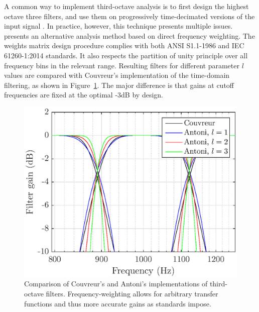 \documentclass[final,3p,times,twocolumn]{elsarticle}
\begin{document}
A common way to implement third-octave analysis is to first design the highest octave three filters, and use them on progressively time-decimated versions of the input signal \cite{davis1986}. In practice, however, this technique presents multiple issues. \cite{antoni2010} presents an alternative analysis method based on direct frequency weighting. The weights matrix design procedure complies with both ANSI S1.1-1986 and IEC 61260-1:2014 standards. It also respects the partition of unity principle over all frequency bins in the relevant range. Resulting filters for different parameter $l$ values are compared with Couvreur's implementation \cite{couvreur} of the time-domain filtering, as shown in Figure~\ref{fig:freq_filt}. The major difference is that gains at cutoff frequencies are fixed at the optimal -3dB by design.\\

\begin{figure}[htbp]
	\centering
		\includegraphics[width=\columnwidth]{tob_imp.eps}
	\caption{Comparison of Couvreur's and Antoni's implementations of third-octave filters. Frequency-weighting allows for arbitrary transfer functions and thus more accurate gains as standards impose.}
	\label{fig:freq_filt}
\end{figure}
\end{document}
